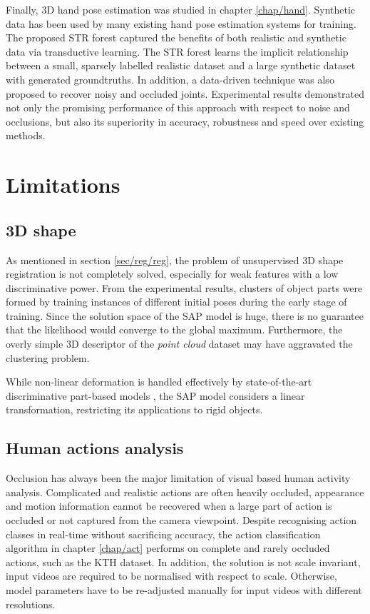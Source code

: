 Finally, 3D hand pose estimation was studied in chapter \ref{chap/hand}. Synthetic data has been used by many existing hand pose estimation systems for training. The proposed STR forest captured the benefits of both realistic and synthetic data via transductive learning. The STR forest learns the implicit relationship between a small, sparsely labelled realistic dataset and a large synthetic dataset with generated groundtruths. In addition, a data-driven technique was also proposed to recover noisy and occluded joints. Experimental results demonstrated not only the promising performance of this approach with respect to noise and occlusions, but also its superiority in accuracy, robustness and speed over existing methods.

\section{Limitations}

\subsection{3D shape} 

As mentioned in section \ref{sec/reg/reg}, the problem of unsupervised 3D shape registration is not completely solved, especially for weak features with a low discriminative power. From the experimental results, clusters of object parts were formed by training instances of different initial poses during the early stage of training. Since the solution space of the SAP model is huge, there is no guarantee that the likelihood would converge to the global maximum. Furthermore, the overly simple 3D descriptor of the \emph{point cloud} dataset may have aggravated the clustering problem.   

While non-linear deformation is handled effectively by state-of-the-art discriminative part-based models \cite{Felzenszwalb2010, Andriluka2009, Pishchulin2012}, the SAP model considers a linear transformation, restricting its applications to rigid objects. 

\subsection{Human actions analysis} 

Occlusion has always been the major limitation of visual based human activity analysis. Complicated and realistic actions are often heavily occluded, appearance and motion information cannot be recovered when a large part of action is occluded or not captured from the camera viewpoint. 
Despite recognising action classes in real-time without sacrificing accuracy, the action classification algorithm in chapter \ref{chap/act} performs on complete and rarely occluded actions, such as the KTH dataset. 
In addition, the solution is not scale invariant, input videos are required to be normalised with respect to scale. Otherwise, model parameters have to be re-adjusted manually for input videos with different resolutions.  

